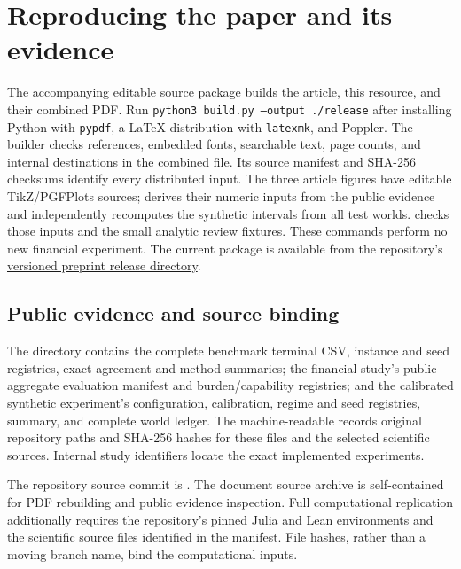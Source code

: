 \section{Reproducing the paper and its evidence}
\label{sec:current-reproduction}

The accompanying editable source package builds the article, this resource,
and their combined PDF. Run \texttt{python3 build.py --output ./release} after
installing Python with \texttt{pypdf}, a LaTeX distribution with
\texttt{latexmk}, and Poppler. The builder checks references, embedded fonts,
searchable text, page counts, and internal destinations in the combined file.
Its source manifest and SHA-256 checksums identify every distributed input.
The three article figures have editable TikZ/PGFPlots sources;
 derives their numeric inputs from the public evidence
and independently recomputes the synthetic intervals from all test worlds.
 checks those inputs and the small analytic review
fixtures. These commands perform no new financial experiment.
The current package is available from the repository's
\href{https://github.com/dramirez37/financial-strategy-library-compression/tree/v0.3.1-ssrn/release/v0.3.1-ssrn}{versioned preprint release directory}.

\subsection{Public evidence and source binding}

The  directory contains the complete benchmark terminal CSV,
instance and seed registries, exact-agreement and method summaries; the
financial study's public aggregate evaluation manifest and burden/capability
registries; and the calibrated synthetic experiment's configuration,
calibration, regime and seed registries, summary, and complete world ledger.
The machine-readable  records original
repository paths and SHA-256 hashes for these files and the selected scientific
sources. Internal study identifiers locate the exact implemented experiments.

The repository source commit is
.
The document source archive is self-contained for PDF rebuilding and public
evidence inspection. Full computational replication additionally requires the
repository's pinned Julia and Lean environments and the scientific source
files identified in the manifest. File hashes, rather than a moving branch
name, bind the computational inputs.

